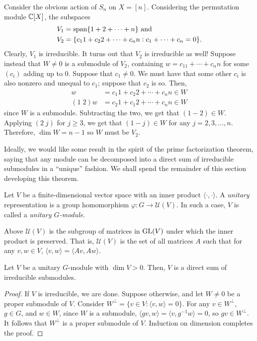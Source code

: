 	\begin{fex}
		\label{ex:sn-action-permutation-mod}
		Consider the obvious action of $S_n$ on $X = [n]$. Considering the permutation module $\mathbb{C}[X]$, the subspaces
		\begin{align*}
			V_1 &= \operatorname{span}\{1+2+\cdots+n\} \text{ and} \\
			V_2 &= \{c_11 + c_22 + \cdots + c_nn : c_1 + \cdots + c_n = 0\}.
		\end{align*}
		Clearly, $V_1$ is irreducible. It turns out that $V_2$ is irreducible as well! Suppose instead that $W \ne 0$ is a submodule of $V_2$, containing $w = c_11 + \cdots + c_nn$ for some $(c_i)$ adding up to $0$. Suppose that $c_1 \ne 0$. We must have that some other $c_i$ is also nonzero and unequal to $c_1$; suppose that $c_2$ is so. Then,
		\begin{align*}
			w &= c_1 1 + c_2 2 + \cdots + c_nn \in W \\
			(1\; 2) w &= c_2 1 + c_1 2 + \cdots + c_n n \in W
		\end{align*}
		since $W$ is a submodule. Subtracting the two, we get that $(1-2) \in W$. Applying $(2\; j)$ for $j \ge 3$, we get that $(1-j) \in W$ for any $j = 2,3,\ldots,n$. Therefore, $\dim W = n-1$ so $W$ must be $V_2$.
	\end{fex}

	Ideally, we would like some result in the spirit of the prime factorization theorem, saying that any module can be decomposed into a direct sum of irreducible submodules in a ``unique'' fashion. We shall spend the remainder of this section developing this theorem.

	\begin{fdef}
		Let $V$ be a finite-dimensional vector space with an inner product $\langle \cdot,\cdot\rangle$. A \emph{unitary} representation is a group homomorphism $\varphi : G \to \mathcal{U}(V)$. In such a case, $V$ is called a \emph{unitary $G$-module}.
	\end{fdef}
	Above $\mathcal{U}(V)$ is the subgroup of matrices in $\operatorname{GL}(V)$ under which the inner product is preserved. That is, $\mathcal{U}(V)$ is the set of all matrices $A$ such that for any $v,w \in V$, $\langle v,w\rangle = \langle Av,Aw\rangle$.

	\begin{lemma}
		Let $V$ be a unitary $G$-module with $\dim V > 0$. Then, $V$ is a direct sum of irreducible submodules.
	\end{lemma}
	\begin{proof}
		If $V$ is irreducible, we are done. Suppose otherwise, and let $W \ne 0$ be a proper submodule of $V$. Consider $W^\perp = \{ v \in V : \langle v,w\rangle = 0 \}$. For any $v \in W^\perp$, $g \in G$, and $w \in W$, since $W$ is a submodule, $\langle gv,w\rangle = \langle v,g^{-1}w\rangle = 0$, so $gv \in W^\perp$. It follows that $W^\perp$ is a proper submodule of $V$. Induction on dimension completes the proof. 
	\end{proof}

